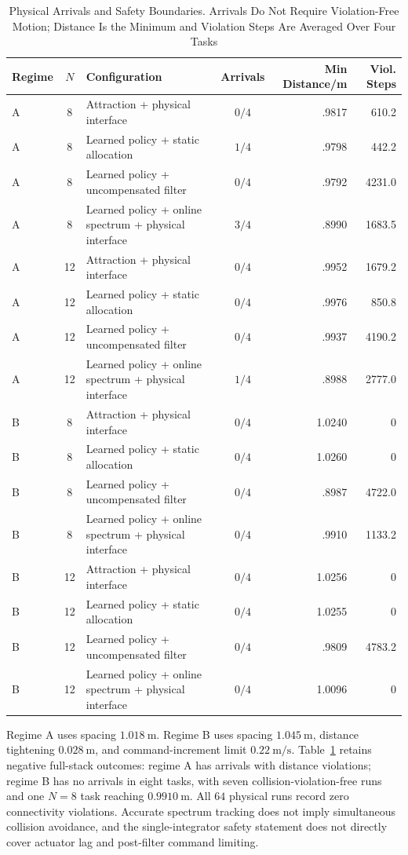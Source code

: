 \begin{table}[t]
\centering\footnotesize
\caption{Physical Arrivals and Safety Boundaries. Arrivals Do Not Require Violation-Free Motion; Distance Is the Minimum and Violation Steps Are Averaged Over Four Tasks}\label{tab:mujoco}
\begin{tabularx}{\textwidth}{@{}lcXcrr@{}}\toprule
Regime & $N$ & Configuration & Arrivals & Min Distance/m & Viol. Steps\\\midrule
A & 8 & Attraction + physical interface & $0/4$ & .9817 & 610.2\\
A & 8 & Learned policy + static allocation & $1/4$ & .9798 & 442.2\\
A & 8 & Learned policy + uncompensated filter & $0/4$ & .9792 & 4231.0\\
A & 8 & Learned policy + online spectrum + physical interface & $3/4$ & .8990 & 1683.5\\
A & 12 & Attraction + physical interface & $0/4$ & .9952 & 1679.2\\
A & 12 & Learned policy + static allocation & $0/4$ & .9976 & 850.8\\
A & 12 & Learned policy + uncompensated filter & $0/4$ & .9937 & 4190.2\\
A & 12 & Learned policy + online spectrum + physical interface & $1/4$ & .8988 & 2777.0\\\midrule
B & 8 & Attraction + physical interface & $0/4$ & 1.0240 & 0\\
B & 8 & Learned policy + static allocation & $0/4$ & 1.0260 & 0\\
B & 8 & Learned policy + uncompensated filter & $0/4$ & .8987 & 4722.0\\
B & 8 & Learned policy + online spectrum + physical interface & $0/4$ & .9910 & 1133.2\\
B & 12 & Attraction + physical interface & $0/4$ & 1.0256 & 0\\
B & 12 & Learned policy + static allocation & $0/4$ & 1.0255 & 0\\
B & 12 & Learned policy + uncompensated filter & $0/4$ & .9809 & 4783.2\\
B & 12 & Learned policy + online spectrum + physical interface & $0/4$ & 1.0096 & 0\\\bottomrule
\end{tabularx}
\end{table}

Regime A uses spacing $1.018\ \mathrm m$. Regime B uses spacing $1.045\ \mathrm m$, distance tightening $0.028\ \mathrm m$, and command-increment limit $0.22\ \mathrm{m/s}$. Table~\ref{tab:mujoco} retains negative full-stack outcomes: regime A has arrivals with distance violations; regime B has no arrivals in eight tasks, with seven collision-violation-free runs and one $N=8$ task reaching $0.9910\ \mathrm m$. All $64$ physical runs record zero connectivity violations. Accurate spectrum tracking does not imply simultaneous collision avoidance, and the single-integrator safety statement does not directly cover actuator lag and post-filter command limiting.

